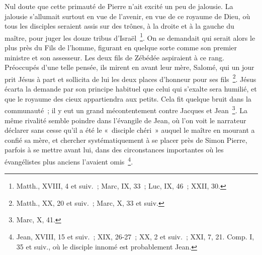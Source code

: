 \documentclass[french,twoside]{book} %
\begin{document}
Nul doute que cette primauté de Pierre n’ait excité un peu de jalousie. La jalousie s’allumait surtout en vue de l’avenir, en vue de ce royaume de Dieu, où tous les disciples seraient assis sur des trônes, à la droite et à la gauche du maître, pour juger les douze tribus d’Israël \footnote{Matth., XVIII, 4 et suiv. ; Marc, IX, 33 ; Luc, IX, 46 ; XXII, 30.}. On se demandait qui serait alors le plus près du Fils de l’homme, figurant en quelque sorte comme son premier ministre et son assesseur. Les deux fils de Zébédée aspiraient à ce rang. Préoccupés d’une telle pensée, ils mirent en avant leur mère, Salomé, qui un jour prit Jésus à part et sollicita de lui les deux places d’honneur pour ses fils \footnote{Matth., XX, 20 et suiv. ; Marc, X, 33 et suiv.}. Jésus écarta la demande par son principe habituel que celui qui s’exalte sera humilié, et que le royaume des cieux appartiendra aux petits. Cela fit quelque bruit dans la communauté ; il y eut un grand mécontentement contre Jacques et Jean \footnote{Marc, X, 41.}. La même rivalité semble poindre dans l’évangile de Jean, où l’on voit le narrateur déclarer sans cesse qu’il a été le « disciple chéri » auquel le maître en mourant a confié sa mère, et chercher systématiquement à se placer près de Simon Pierre, parfois à se mettre avant lui, dans des circonstances importantes où les évangélistes plus anciens l’avaient omis \footnote{Jean, XVIII, 15 et suiv. ; XIX, 26-27 ; XX, 2 et suiv. ; XXI, 7, 21. Comp. I, 35 et suiv., où le disciple innomé est probablement Jean.}.\par
\end{document}
